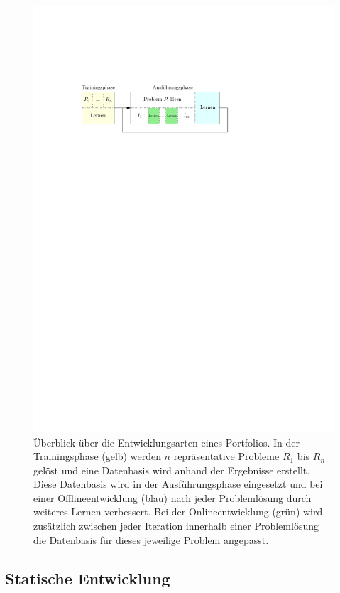 \begin{figure}[h]
\centering
\includegraphics[scale=1.3]{progress.pdf}
\caption[Entwicklung eines Algorithmenportfolios]{Überblick über die Entwicklungsarten eines Portfolios. In der Trainingsphase (gelb) werden $n$ repräsentative Probleme $R_1$ bis $R_n$ gelöst und eine Datenbasis wird anhand der Ergebnisse erstellt. Diese Datenbasis wird in der Ausführungsphase eingesetzt und bei einer Offlineentwicklung (blau) nach jeder Problemlösung durch weiteres Lernen verbessert. Bei der Onlineentwicklung (grün) wird zusätzlich zwischen jeder Iteration innerhalb einer Problemlösung die Datenbasis für dieses jeweilige Problem angepasst.}
\label{entwicklung}
\end{figure}

\subsection{Statische Entwicklung}

